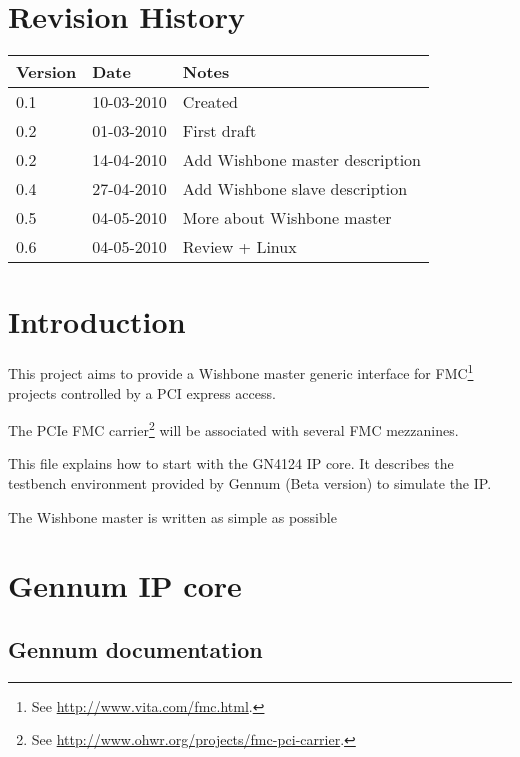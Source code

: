 \documentclass[10pt,a4paper]{cerndoc}
\begin{document}
\cerntitle
\section*{Revision History}
\begin{tabularx}{\textwidth}{|p{3cm}|p{3cm}|X|}
\hline \textbf{Version}&\textbf{Date}&\textbf{Notes}\\ \hline \hline
0.1 & 10-03-2010 & Created\\ \hline
0.2 & 01-03-2010 & First draft\\ \hline
0.2 & 14-04-2010 & Add Wishbone master description \\ \hline
0.4 & 27-04-2010 & Add Wishbone slave description\\ \hline
0.5 & 04-05-2010 & More about Wishbone master\\ \hline
0.6 & 04-05-2010 & Review + Linux\\ \hline
\end{tabularx}

\tableofcontents
\listoffigures
\clearpage

\section*{Introduction}
This project aims to provide a Wishbone master generic interface for FMC\footnote{See \href{http://www.vita.com/fmc.html}{http://www.vita.com/fmc.html}.} projects controlled by a PCI express access.

The PCIe FMC carrier\footnote{See \href{http://www.ohwr.org/projects/fmc-pci-carrier}{http://www.ohwr.org/projects/fmc-pci-carrier}.} will be associated with several FMC mezzanines.

This file explains how to start with the GN4124 IP core. It describes the testbench environment provided by Gennum (Beta version) to simulate the IP. 

The Wishbone master is written as simple as possible

\section{Gennum IP core}
\subsection{Gennum documentation}
\end{document}
